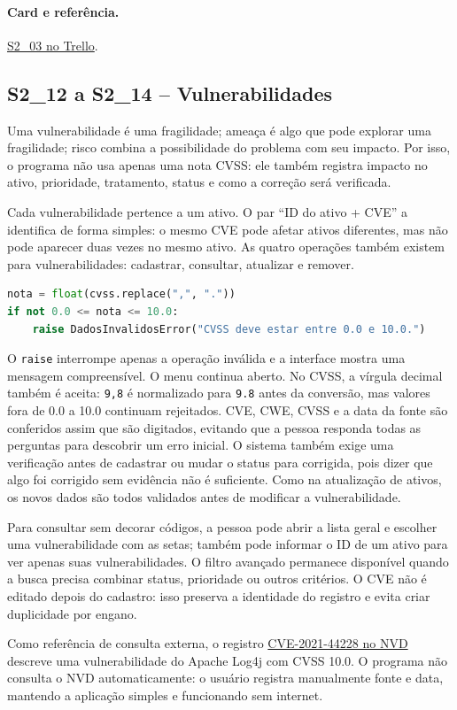 \documentclass[11pt,a4paper]{article}
\newcommand{\referencia}[2]{\paragraph{Card e referência.}\href{#1}{#2}}
\newcommand{\cardsection}[1]{\Needspace{12\baselineskip}\subsection{#1}}
\begin{document}
\referencia{https://trello.com/c/NdgkJaYg}{S2\_03 no Trello}.

\cardsection{S2\_12 a S2\_14 -- Vulnerabilidades}

Uma vulnerabilidade é uma fragilidade; ameaça é algo que pode explorar uma fragilidade; risco combina a possibilidade do problema com seu impacto. Por isso, o programa não usa apenas uma nota CVSS: ele também registra impacto no ativo, prioridade, tratamento, status e como a correção será verificada.

Cada vulnerabilidade pertence a um ativo. O par ``ID do ativo + CVE'' a identifica de forma simples: o mesmo CVE pode afetar ativos diferentes, mas não pode aparecer duas vezes no mesmo ativo. As quatro operações também existem para vulnerabilidades: cadastrar, consultar, atualizar e remover.

\begin{lstlisting}[language=Python,caption={Validação simples do CVSS}]
nota = float(cvss.replace(",", "."))
if not 0.0 <= nota <= 10.0:
    raise DadosInvalidosError("CVSS deve estar entre 0.0 e 10.0.")
\end{lstlisting}

O \texttt{raise} interrompe apenas a operação inválida e a interface mostra uma mensagem compreensível. O menu continua aberto. No CVSS, a vírgula decimal também é aceita: \texttt{9,8} é normalizado para \texttt{9.8} antes da conversão, mas valores fora de 0.0 a 10.0 continuam rejeitados. CVE, CWE, CVSS e a data da fonte são conferidos assim que são digitados, evitando que a pessoa responda todas as perguntas para descobrir um erro inicial. O sistema também exige uma verificação antes de cadastrar ou mudar o status para corrigida, pois dizer que algo foi corrigido sem evidência não é suficiente. Como na atualização de ativos, os novos dados são todos validados antes de modificar a vulnerabilidade.

Para consultar sem decorar códigos, a pessoa pode abrir a lista geral e escolher uma vulnerabilidade com as setas; também pode informar o ID de um ativo para ver apenas suas vulnerabilidades. O filtro avançado permanece disponível quando a busca precisa combinar status, prioridade ou outros critérios. O CVE não é editado depois do cadastro: isso preserva a identidade do registro e evita criar duplicidade por engano.

Como referência de consulta externa, o registro \href{https://nvd.nist.gov/vuln/detail/CVE-2021-44228}{CVE-2021-44228 no NVD} descreve uma vulnerabilidade do Apache Log4j com CVSS 10.0. O programa não consulta o NVD automaticamente: o usuário registra manualmente fonte e data, mantendo a aplicação simples e funcionando sem internet.
\end{document}
